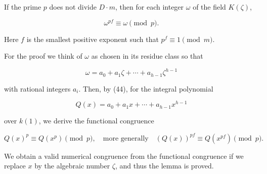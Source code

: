 If the prime $p$ does not divide $D \cdot m$, then for each integer $\omega$ of the field $K(\zeta)$,

$$\omega^{pf} \equiv \omega \pmod{p}.$$

Here $f$ is the smallest positive exponent such that $p^f \equiv 1 \pmod{m}$.

For the proof we think of $\omega$ as chosen in its residue class so that

$$\omega = a_0 + a_1\zeta + \cdots + a_{h-1}\zeta^{h-1}$$

with rational integers $a_i$. Then, by (44), for the integral polynomial

$$Q(x) = a_0 + a_1x + \cdots + a_{h-1}x^{h-1}$$

over $k(1)$, we derive the functional congruence

$$Q(x)^p \equiv Q(x^p) \pmod{p}, \quad \text{more generally} \quad (Q(x))^{pf} \equiv Q(x^{pf}) \pmod{p}.$$

We obtain a valid numerical congruence from the functional congruence if we replace $x$ by the algebraic number $\zeta$, and thus the lemma is proved.
